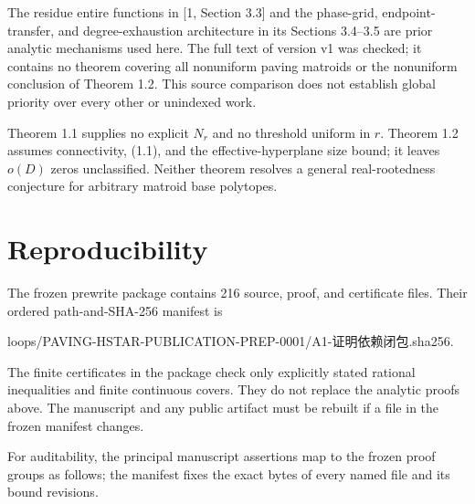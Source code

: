 \documentclass[10pt]{article}
\begin{document}
The residue entire functions in [1, Section 3.3] and the phase-grid,
endpoint-transfer, and degree-exhaustion architecture in its Sections
3.4--3.5 are prior analytic mechanisms used here.  The full text of version
v1 was checked; it contains no theorem covering all nonuniform paving
matroids or the nonuniform conclusion of Theorem 1.2.  This source comparison
does not establish global priority over every other or unindexed work.

Theorem 1.1 supplies no explicit $N_r$ and no threshold uniform in $r$.
Theorem 1.2 assumes connectivity, (1.1), and the effective-hyperplane size
bound; it leaves $o(D)$ zeros unclassified.  Neither theorem resolves a
general real-rootedness conjecture for arbitrary matroid base polytopes.

\section{Reproducibility}


The frozen prewrite package contains 216 source, proof, and certificate files.
Their ordered path-and-SHA-256 manifest is

loops/PAVING-HSTAR-PUBLICATION-PREP-0001/A1-{\cjkfont 证\allowbreak{}明\allowbreak{}依\allowbreak{}赖\allowbreak{}闭\allowbreak{}包}.sha256.

The finite certificates in the package check only explicitly stated rational
inequalities and finite continuous covers.  They do not replace the analytic
proofs above.  The manuscript and any public artifact must be rebuilt if a
file in the frozen manifest changes.

For auditability, the principal manuscript assertions map to the frozen proof
groups as follows; the manifest fixes the exact bytes of every named file and
its bound revisions.
\end{document}

